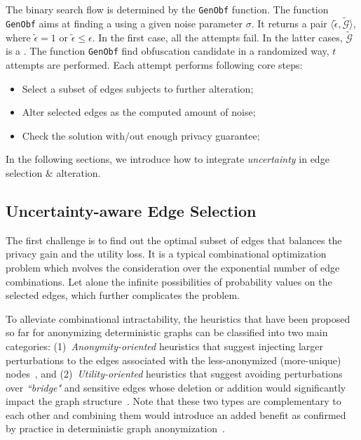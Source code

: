 The binary search flow is determined by the \texttt{GenObf} function. 
The function \texttt{GenObf} aims at finding a {\keobf} using a given noise parameter $\sigma$.
It returns a pair $\langle \tilde{\epsilon}, \tilde{\mathcal{G}} \rangle$, where $\tilde{\epsilon} =1$ or $\tilde{\epsilon} \le \epsilon$. In the first case, all the attempts fail. In the latter cases, $\tilde{\mathcal{G}}$ is a {\keobf}. 
The function \texttt{GenObf} find obfuscation candidate in a randomized way, $t$ attempts are performed. Each attempt performs following core steps:
\begin{itemize}
    \item{Select a subset of edges subjects to further alteration;}
    \item{Alter selected edges as the computed amount of noise;}
    \item{Check the solution with/out enough privacy guarantee;}
\end{itemize}
In the following sections, we introduce how to integrate \emph{uncertainty} in edge selection \& alteration. 


\subsection{Uncertainty-aware Edge Selection}
The first challenge is to find out the optimal subset of edges that balances the privacy gain and the utility loss. 
It is a typical combinational optimization problem which nvolves the consideration over the exponential number of edge combinations. Let alone the infinite possibilities of probability values on the selected edges, which further complicates the problem.

To alleviate combinational intractability, the heuristics that have been proposed so far for anonymizing deterministic graphs can be classified into two main categories: 
(1)~{\em Anonymity-oriented} heuristics that suggest injecting larger perturbations to the edges associated with the less-anonymized (more-unique) 
nodes~\cite{Boldi_Injecting_2012,Liu_Towards_2008, Thompson_The_2009,Zhou_Preserving_2008}, and 
(2)~{\em Utility-oriented} heuristics that suggest avoiding perturbations over {\em ``bridge"} and sensitive edges whose deletion or addition would 
significantly impact the graph structure~\cite{casasprivacy,Ying_Randomizing_2008,Liu_Privacy_2009,Ninggal_Utility_2015}.
Note that these two types are complementary to each other and combining them would introduce an added benefit as confirmed by practice in deterministic graph anonymization~\cite{casasprivacy}. 

